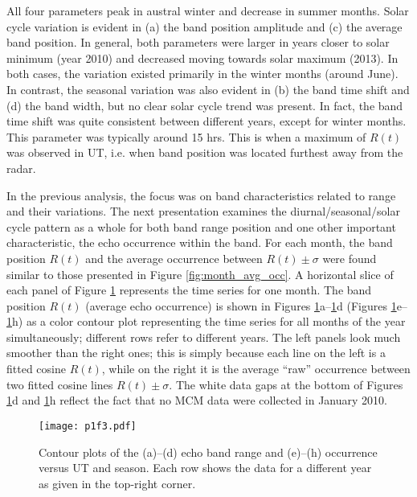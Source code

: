All four parameters peak in austral winter and decrease in summer months. Solar cycle variation is evident in (a) the band position amplitude and (c) the average band position. In general, both parameters were larger in years closer to solar minimum (year 2010) and decreased moving towards solar maximum (2013).  In both cases, the variation existed primarily in the winter months (around June). In contrast, the seasonal variation was also evident in (b) the band time shift and (d) the band width, but no clear solar cycle trend was present. In fact, the band time shift was quite consistent between different years, except for winter months. This parameter was typically around 15 hrs. This is when a maximum of \(R\left(t\right)\) was observed in UT, i.e. when band position was located furthest away from the radar.

In the previous analysis, the focus was on band characteristics related to range and their variations. The next presentation examines the diurnal/seasonal/solar cycle pattern as a whole for both band range position and one other important characteristic, the echo occurrence within the band. For each month, the band position \(R\left(t\right)\) and the average occurrence between \(R\left(t\right)\pm \sigma\) were found similar to those presented in Figure \ref{fig:month_avg_occ}. A horizontal slice of each panel of Figure \ref{fig:year_color} represents the time series for one month. The band position \(R\left(t\right)\) (average echo occurrence) is shown in Figures \ref{fig:year_color}a--\ref{fig:year_color}d (Figures \ref{fig:year_color}e--\ref{fig:year_color}h) as a color contour plot representing the time series for all months of the year simultaneously; different rows refer to  different years. The left panels look much smoother than the right ones; this is simply because each line on the left is a fitted cosine \(R\left(t\right)\), while on the right it is the average ``raw'' occurrence between two fitted cosine lines \(R\left(t\right)\pm \sigma\). The white data gaps at the bottom of Figures \ref{fig:year_color}d and \ref{fig:year_color}h reflect the fact that no MCM data were collected in January 2010.
	
\begin{figure}
\texttt{[image: p1f3.pdf]}
\caption{Contour plots of the (a)--(d) echo band range and (e)--(h) occurrence versus UT and season. Each row shows the data for a different year as given in the top-right corner.}
\label{fig:year_color}
\end{figure}

